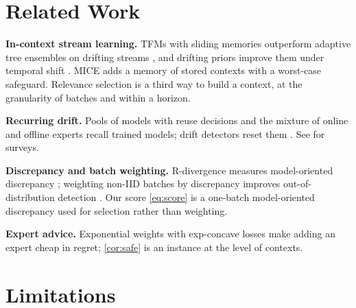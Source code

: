 \documentclass{article}
\theoremstyle{plain}
\theoremstyle{definition}
\theoremstyle{remark}
\newcommand{\mice}{\textsc{MICE}}
\begin{document}
\section{Related Work}
\label{sec:related}

\textbf{In-context stream learning.} TFMs with sliding memories outperform adaptive tree ensembles on drifting
streams \citep{lourenco2026streams}, and drifting priors improve them under temporal shift \citep{helli2024drift}.
\mice{} \citep{mice2026} adds a memory of stored contexts with a worst-case safeguard. Relevance selection is a third
way to build a context, at the granularity of batches and within a horizon.

\textbf{Recurring drift.} Pools of models with reuse decisions \citep{goncalves2013rcd,gama2014recurrent} and the
mixture of online and offline experts \citep{zhao2025mooe} recall trained models; drift detectors reset them
\citep{gama2004ddm}. See \citet{gama2014survey,lu2019learning} for surveys.

\textbf{Discrepancy and batch weighting.} R-divergence measures model-oriented discrepancy \citep{zhao2023rdiv};
weighting non-IID batches by discrepancy improves out-of-distribution detection \citep{zhao2024wnb}. Our score
\eqref{eq:score} is a one-batch model-oriented discrepancy used for selection rather than weighting.

\textbf{Expert advice.} Exponential weights with exp-concave losses \citep{cesabianchi2006prediction,hazan2007log}
make adding an expert cheap in regret; \cref{cor:safe} is an instance at the level of contexts.

\section{Limitations}
\end{document}
